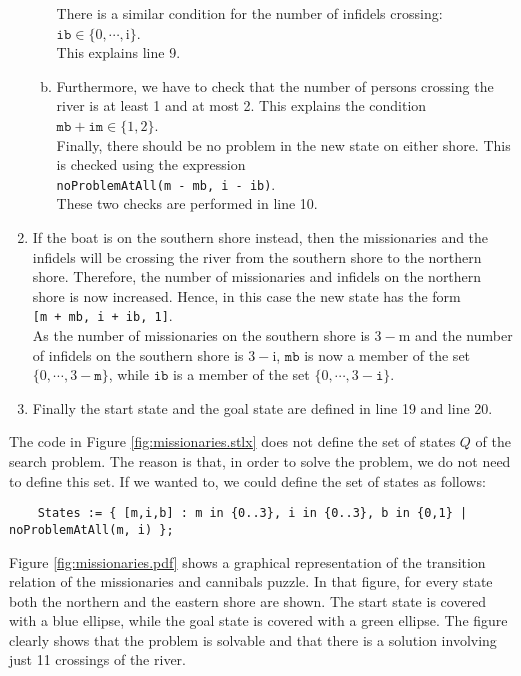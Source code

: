 \begin{enumerate}
\begin{enumerate}[(a)]
            There is a similar condition for the number of infidels crossing:
            \\[0.2cm]
            \hspace*{1.3cm}
            $\mathtt{ib} \in \{0,\cdots,\mathrm{i}\}$.
            \\[0.2cm]
            This explains line 9.
      \item Furthermore, we have to check that the number of persons crossing the river is at least 1
            and at most 2.  This explains the condition
            \\[0.2cm]
            \hspace*{1.3cm}
            $\mathtt{mb} + \mathtt{im} \in \{1,2\}$.
            \\[0.2cm]
            Finally, there should be no problem in the new state on either shore.  This is checked
            using the expression
            \\[0.2cm]
            \hspace*{1.3cm}
            \texttt{noProblemAtAll(m - mb, i - ib)}.
            \\[0.2cm]
            These two checks are performed in line 10.
      \end{enumerate}
\item If the boat is on the southern shore instead, then the missionaries and the infidels will be crossing
      the river from the southern shore to the northern shore.  Therefore, the number of missionaries and
      infidels on the northern shore is now increased.  Hence, in this case the new state has the form
      \\[0.2cm]
      \hspace*{1.3cm}
      \texttt{[m + mb, i + ib, 1]}.
      \\[0.2cm]
      As the number of missionaries on the southern shore is $3 - \mathrm{m}$ and the number of infidels on the
      southern shore is $3 - \mathrm{i}$, $\mathtt{mb}$ is now a member of the set $\{0,\cdots,3 -\mathtt{m}\}$, while 
      $\mathtt{ib}$ is a member of the set $\{0,\cdots,3 - \mathtt{i}\}$.
\item Finally the start state and the goal state are defined in line 19 and line 20.
\end{enumerate}
The code in Figure \ref{fig:missionaries.stlx} does not define the set of states $Q$ of the search problem.  The
reason is that, in order to solve the problem, we do not need to define this set.  If we wanted to, we could
define the set of states as follows: 
\begin{verbatim}
    States := { [m,i,b] : m in {0..3}, i in {0..3}, b in {0,1} | noProblemAtAll(m, i) };
\end{verbatim}
Figure \ref{fig:missionaries.pdf} shows a graphical representation of the transition relation of the
missionaries and cannibals puzzle.  In that figure, for every state both the northern and the
eastern shore are shown.  The start state is covered with a blue ellipse, while the goal state is
covered with a green ellipse.  The figure clearly shows that the problem is solvable and that there
is a solution involving just 11 crossings of the river.
\eox

